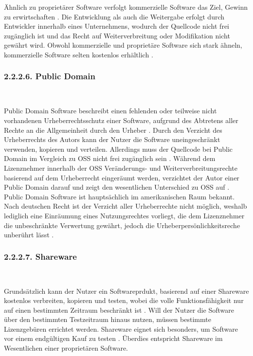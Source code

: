 Ähnlich zu proprietärer Software verfolgt kommerzielle Software das Ziel, Gewinn zu erwirtschaften \cite[S. 14]{bitkom_open_2016}. Die Entwicklung als auch die Weitergabe erfolgt durch Entwickler innerhalb eines Unternehmens, wodurch der Quellcode nicht frei zugänglich ist und das Recht auf Weiterverbreitung oder Modifikation nicht gewährt wird. Obwohl kommerzielle und proprietäre Software sich stark ähneln, kommerzielle Software selten kostenlos erhältlich \cite[S. 4]{wichmann_linux-_2005}.

\subsubsection{2.2.2.6. Public Domain}$~$

Public Domain Software beschreibt einen fehlenden oder teilweise nicht vorhandenen Urheberrechtsschutz einer Software, aufgrund des Abtretens aller Rechte an die Allgemeinheit durch den Urheber \cite[S. 14]{renner_open_2006}. Durch den Verzicht des Urheberrechts des Autors kann der Nutzer die Software uneingeschränkt verwenden, kopieren und verteilen. Allerdings muss der Quellcode bei Public Domain im Vergleich zu OSS nicht frei zugänglich sein \cite[S. 14]{renner_open_2006}.  Während dem Lizenznehmer innerhalb der OSS Veränderungs- und Weiterverbreitungsrechte basierend auf dem Urheberrecht eingeräumt werden, verzichtet der Autor einer Public Domain darauf und zeigt den wesentlichen Unterschied zu OSS auf \cite[S. 10]{wilmer_rechtliche_2021}. Public Domain Software ist hauptsächlich im amerikanischen Raum bekannt. Nach deutschen Recht ist der Verzicht aller Urheberrechte nicht möglich, weshalb lediglich eine Einräumung eines Nutzungsrechtes vorliegt, die dem Lizenznehmer die unbeschränkte Verwertung gewährt, jedoch die Urheberpersönlichkeitsreche unberührt lässt \cite[S. 14]{renner_open_2006}.

\subsubsection{2.2.2.7. Shareware}$~$

Grundsätzlich kann der Nutzer ein Softwareprdukt, basierend auf einer Shareware kostenlos verbreiten, kopieren und testen, wobei die volle Funktionsfähigkeit nur auf einen bestimmten Zeitraum beschränkt ist \cite[S. 27]{groll_1x1_2021}. Will der Nutzer die Software über den bestimmten Testzeitraum hinaus nutzen, müssen bestimmte Lizenzgebüren errichtet werden. Shareware eignet sich besonders, um Software vor einem endgültigen Kauf zu testen \cite[S. 14/15]{renner_open_2006}. Überdies entspricht Shareware im Wesentlichen einer proprietären Software.

